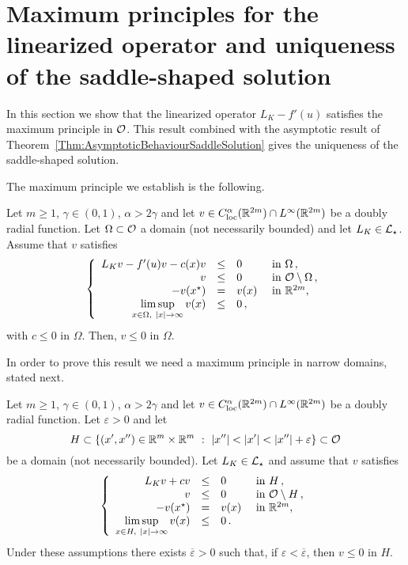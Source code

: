 \section{Maximum principles for the linearized operator and uniqueness of the saddle-shaped solution}
\label{Sec:MaximumPrinciple}

In this section we show that the linearized operator $L_K  -f'(u)$ satisfies the maximum principle in $\mathcal{O}$. This result combined with the asymptotic result of Theorem~\ref{Thm:AsymptoticBehaviourSaddleSolution} gives the uniqueness of the saddle-shaped solution.

The maximum principle we establish is the following.

\begin{proposition}
	\label{Prop:MaximumPrincipleInO}
	Let $m\geq 1$, $\gamma \in (0,1)$, $\alpha > 2\gamma$ and let $v\in C^\alpha_{\mathrm{loc}}(\mathbb{R}^{2m})\cap L^\infty(\mathbb{R}^{2m})$ be a doubly radial function. Let $\Omega \subset \mathcal{O}$ a domain (not necessarily bounded) and let $L_K  \in \mathcal{L}_\star$. Assume that $v$ satisfies
	$$
	\left\{\begin{array}{rcll}
	L_K v - f'(u)v - c(x)v &\leq & 0 &\textrm{ in } \Omega\,,\\
	v &\leq & 0 &\textrm{ in } \mathcal{O} \setminus \Omega\,,\\
	- v(x^\star) & = & v(x) &\textrm{ in } \mathbb{R}^{2m},\\
	\displaystyle \limsup_{x\in \Omega, \ |x|\to \infty} v(x) &\leq & 0\,,
	\end{array} \right.
	$$
	with $c\leq 0$ in $\Omega$.
	Then, $v \leq 0$ in $\Omega$.
\end{proposition}

In order to prove this result we need a maximum principle in narrow domains, stated next.

\begin{proposition}
	\label{Prop:MaximumPrincipleNarrowDomainsOdd}
	Let $m\geq 1$, $\gamma \in (0,1)$, $\alpha > 2\gamma$ and let $v\in C^\alpha_{\mathrm{loc}}(\mathbb{R}^{2m})\cap L^\infty(\mathbb{R}^{2m})$ be a doubly radial function. Let $\varepsilon>0$ and let
	$$
	H \subset \{(x',x'')\in \R^m\times\R^m \ : \ |x''|<|x'|<|x''|+ \varepsilon\} \subset \ocal
	$$ 
	be a domain (not necessarily bounded). Let $L_K  \in \mathcal{L}_\star$ and assume that $v$ satisfies
	\begin{equation}
	\label{Eq:AssumptionsMaxPNarrow}
	\left\{\begin{array}{rcll}
	L_K v + cv&\leq & 0 &\textrm{ in } H\,,\\
	v &\leq & 0 &\textrm{ in } \mathcal{O} \setminus H\,,\\
	- v(x^\star) & = & v(x) &\textrm{ in } \mathbb{R}^{2m},\\
	\displaystyle \limsup_{x\in H, \ |x|\to \infty} v(x) &\leq & 0\,.
	\end{array} \right.
	\end{equation}
	Under these assumptions there exists $\overline{\varepsilon}>0$ such that, if $\varepsilon<\overline{\varepsilon}$, then $v \leq 0$ in $H$.
\end{proposition}

